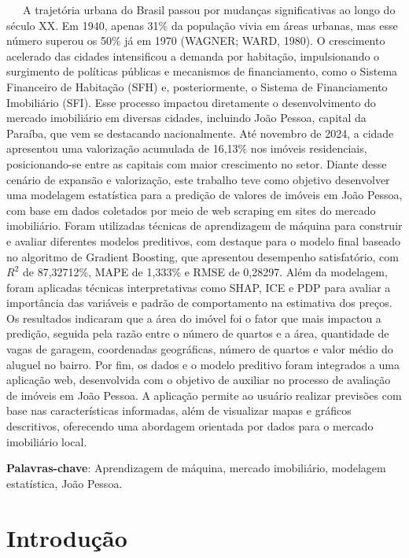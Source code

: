 \documentclass[
  12pt,
  a4paper,
]{scrreprt}
\begin{document}
~~~A trajetória urbana do Brasil passou por mudanças significativas ao
longo do século XX. Em 1940, apenas 31\% da população vivia em áreas
urbanas, mas esse número superou os 50\% já em 1970 (WAGNER; WARD,
1980). O crescimento acelerado das cidades intensificou a demanda por
habitação, impulsionando o surgimento de políticas públicas e mecanismos
de financiamento, como o Sistema Financeiro de Habitação (SFH) e,
posteriormente, o Sistema de Financiamento Imobiliário (SFI). Esse
processo impactou diretamente o desenvolvimento do mercado imobiliário
em diversas cidades, incluindo João Pessoa, capital da Paraíba, que vem
se destacando nacionalmente. Até novembro de 2024, a cidade apresentou
uma valorização acumulada de 16,13\% nos imóveis residenciais,
posicionando-se entre as capitais com maior crescimento no setor. Diante
desse cenário de expansão e valorização, este trabalho teve como
objetivo desenvolver uma modelagem estatística para a predição de
valores de imóveis em João Pessoa, com base em dados coletados por meio
de web scraping em sites do mercado imobiliário. Foram utilizadas
técnicas de aprendizagem de máquina para construir e avaliar diferentes
modelos preditivos, com destaque para o modelo final baseado no
algoritmo de Gradient Boosting, que apresentou desempenho satisfatório,
com \(R^2\) de 87,32712\%, MAPE de 1,333\% e RMSE de 0,28297. Além da
modelagem, foram aplicadas técnicas interpretativas como SHAP, ICE e PDP
para avaliar a importância das variáveis e padrão de comportamento na
estimativa dos preços. Os resultados indicaram que a área do imóvel foi
o fator que mais impactou a predição, seguida pela razão entre o número
de quartos e a área, quantidade de vagas de garagem, coordenadas
geográficas, número de quartos e valor médio do aluguel no bairro. Por
fim, os dados e o modelo preditivo foram integrados a uma aplicação web,
desenvolvida com o objetivo de auxiliar no processo de avaliação de
imóveis em João Pessoa. A aplicação permite ao usuário realizar
previsões com base nas características informadas, além de visualizar
mapas e gráficos descritivos, oferecendo uma abordagem orientada por
dados para o mercado imobiliário local.

\begin{flushleft}
\textbf{Palavras-chave}: Aprendizagem de máquina, mercado imobiliário, modelagem estatística, João Pessoa.
\end{flushleft}

\chapter{Introdução}\label{introduuxe7uxe3o}
\end{document}

